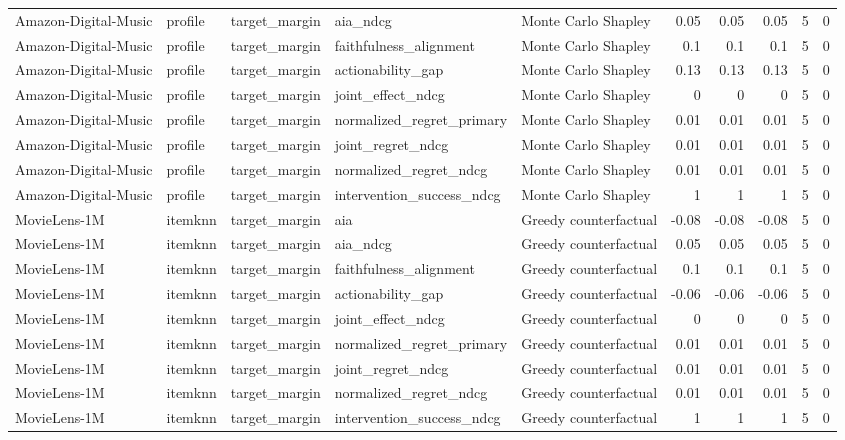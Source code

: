 \begin{table}[t]
{\begin{tabular}{lllllrrrrr}
Amazon-Digital-Music & profile & target\_margin & aia\_ndcg & Monte Carlo Shapley & 0.05 & 0.05 & 0.05 & 5 & 0 \\
Amazon-Digital-Music & profile & target\_margin & faithfulness\_alignment & Monte Carlo Shapley & 0.1 & 0.1 & 0.1 & 5 & 0 \\
Amazon-Digital-Music & profile & target\_margin & actionability\_gap & Monte Carlo Shapley & 0.13 & 0.13 & 0.13 & 5 & 0 \\
Amazon-Digital-Music & profile & target\_margin & joint\_effect\_ndcg & Monte Carlo Shapley & 0 & 0 & 0 & 5 & 0 \\
Amazon-Digital-Music & profile & target\_margin & normalized\_regret\_primary & Monte Carlo Shapley & 0.01 & 0.01 & 0.01 & 5 & 0 \\
Amazon-Digital-Music & profile & target\_margin & joint\_regret\_ndcg & Monte Carlo Shapley & 0.01 & 0.01 & 0.01 & 5 & 0 \\
Amazon-Digital-Music & profile & target\_margin & normalized\_regret\_ndcg & Monte Carlo Shapley & 0.01 & 0.01 & 0.01 & 5 & 0 \\
Amazon-Digital-Music & profile & target\_margin & intervention\_success\_ndcg & Monte Carlo Shapley & 1 & 1 & 1 & 5 & 0 \\
MovieLens-1M & itemknn & target\_margin & aia & Greedy counterfactual & -0.08 & -0.08 & -0.08 & 5 & 0 \\
MovieLens-1M & itemknn & target\_margin & aia\_ndcg & Greedy counterfactual & 0.05 & 0.05 & 0.05 & 5 & 0 \\
MovieLens-1M & itemknn & target\_margin & faithfulness\_alignment & Greedy counterfactual & 0.1 & 0.1 & 0.1 & 5 & 0 \\
MovieLens-1M & itemknn & target\_margin & actionability\_gap & Greedy counterfactual & -0.06 & -0.06 & -0.06 & 5 & 0 \\
MovieLens-1M & itemknn & target\_margin & joint\_effect\_ndcg & Greedy counterfactual & 0 & 0 & 0 & 5 & 0 \\
MovieLens-1M & itemknn & target\_margin & normalized\_regret\_primary & Greedy counterfactual & 0.01 & 0.01 & 0.01 & 5 & 0 \\
MovieLens-1M & itemknn & target\_margin & joint\_regret\_ndcg & Greedy counterfactual & 0.01 & 0.01 & 0.01 & 5 & 0 \\
MovieLens-1M & itemknn & target\_margin & normalized\_regret\_ndcg & Greedy counterfactual & 0.01 & 0.01 & 0.01 & 5 & 0 \\
MovieLens-1M & itemknn & target\_margin & intervention\_success\_ndcg & Greedy counterfactual & 1 & 1 & 1 & 5 & 0 \\

\end{tabular}}
\end{table}
